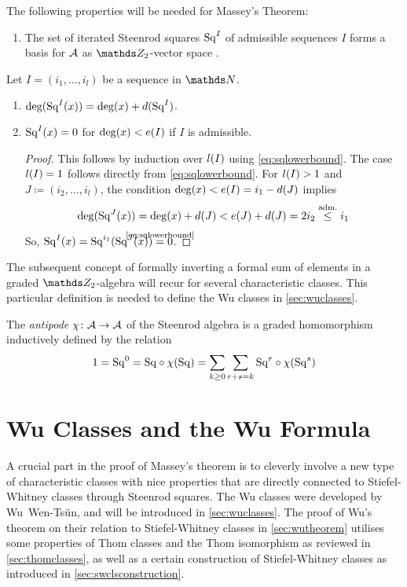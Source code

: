 \begin{Rem}\label{rem:sq}
  The following properties will be needed for Massey's Theorem:
  \begin{enumerate}
  \item The set of iterated Steenrod squares $\mathrm{Sq}^{I}$ of admissible
    sequences $I$ forms a basis for $\mathcal{A}$ as $\Zmod2$-vector space
    \cite[Chap.~6, Theorem~1]{mosher}.
  \end{enumerate}
  Let $I=(i_1,\dotsc,i_l)$ be a sequence in $\Nat$.
  \begin{enumerate}[resume]
  \item $\deg(\mathrm{Sq}^{I}(x)) = \deg(x) + d(\mathrm{Sq}^{I})$.
  \item\label{item:squpperboundgeneral} $\mathrm{Sq}^{I}(x) = 0$ for  $\deg(x)<e(I)$ if $I$ is admissible.
    \begin{proof}
      This follows by induction over $l(I)$ using
      \eqref{eq:sqlowerbound}. The case $l(I)=1$ follows directly 
      from \eqref{eq:sqlowerbound}.
      For $l(I)>1$ and $J\coloneqq(i_2,\dotsc,i_l)$, the condition
      $\deg(x) < e(I)=i_1-d(J)$
      implies
      \begin{gather*}
        \deg(\mathrm{Sq}^{J}(x))
        = \deg(x)+d(J) < e(J)+d(J) = 2i_2
        \overset{\text{adm.}}\leq i_1
      \end{gather*}
      So,
      $\Sq I(x)=\Sq{i_1}(\Sq J(x)) \cequalsby{\eqref{eq:sqlowerbound}} 0$.
    \end{proof}
  \end{enumerate}
\end{Rem}

The subsequent concept of formally inverting a formal sum of elements
in a graded $\Zmod2$-algebra will recur for several characteristic
classes. This particular definition is needed to define the Wu classes
in \autoref{sec:wuclasses}. 
\begin{Def}\label{def:antipode}
  The \emph{antipode} $\chi\colon \mathcal{A}\to\mathcal{A}$ of the Steenrod algebra is a
  graded homomorphism inductively defined by the relation
  \begin{gather*}
    1 = \mathrm{Sq}^{0}
    = \mathrm{Sq} \circ \chi(\mathrm{Sq})
    = \sum_{k\geq0}\sum_{r+s=k} \mathrm{Sq}^{r} \circ \chi(\mathrm{Sq}^{s})
  \end{gather*}
\end{Def}

\section{Wu Classes and the Wu Formula}\label{sec:wuclassesmain}
A crucial part in the proof of Massey's theorem is to cleverly involve
a new type of characteristic classes with nice properties that are
directly connected to Stiefel-Whitney classes through Steenrod
squares.
The Wu classes were developed by Wu~Wen-Tsün, and will be introduced in
\autoref{sec:wuclasses}.
The proof of Wu's theorem on their relation to Stiefel-Whitney
classes in \autoref{sec:wutheorem} utilises some properties of Thom
classes and the Thom isomorphism as reviewed in
\autoref{sec:thomclasses}, as well as a certain construction of
Stiefel-Whitney classes as introduced in
\autoref{sec:swclsconstruction}.


